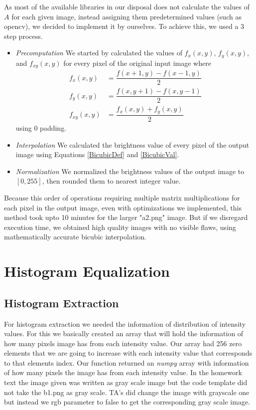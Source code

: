 \documentclass[conference]{IEEEtran}
\begin{document}
As most of the available libraries in our disposal does not calculate the values of $A$ for each given image, instead assigning them predetermined values (such as opencv), we decided to implement it by ourselves. To achieve this, we used a 3 step process.
\begin{itemize}
	\item \textit{Precomputation} We started by calculated the values of $f_x(x,y)$, $f_y(x,y)$, and $f_{xy}(x,y)$ for every pixel of the original input image where
	\begin{align}
		f_x(x,y) &= \dfrac{f(x+1,y)-f(x-1,y)}{2}\\
		f_y(x,y) &= \dfrac{f(x,y+1)-f(x,y-1)}{2}\\
		f_{xy}(x,y) &= \dfrac{f_x(x,y)+f_y(x,y)}{2}
	\end{align}
	using $0$ padding.
	\item \textit{Interpolation} We calculated the brightness value of every pixel of the output image using Equations \ref{BicubicDef} and \ref{BicubicVal}.
	\item \textit{Normalization} We normalized the brightness values of the output image to $[0,255]$, then rounded them to nearest integer value.
\end{itemize}

Because this order of operations requiring multiple matrix multiplications for each pixel in the output image, even with optimizations we implemented, this method took upto 10 minutes for the larger "a2.png" image. But if we disregard execution time, we obtained high quality images with no visible flaws, using mathematically accurate bicubic interpolation.

\section{Histogram Equalization}


\subsection{Histogram Extraction}
For histogram extraction we needed the information of distribution of intensity values. For this we basically created an array that will hold the information of how many pixels image has from each intensity value. Our array had 256 zero elements that we are going to increase with each intensity value that corresponds to that elements index. Our function returned an \emph{numpy} array with information of how many pixels the image has from each intensity value. In the homework text the image given was written as gray scale image but the code template did not take the b1.png as gray scale. TA's did change the image with grayscale one but instead we rgb parameter to false to get the corresponding gray scale image.
\end{document}
